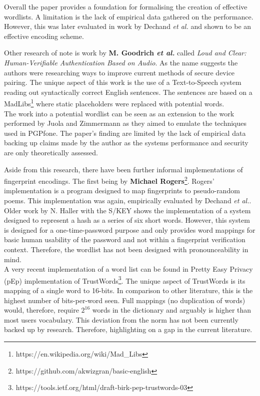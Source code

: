 Overall the paper provides a foundation for formalising the creation of effective wordlists. A limitation is the lack of empirical data gathered on the performance. However, this was later evaluated in work by Dechand \textit{et al.} \cite{dechand2016empirical} and shown to be an effective encoding scheme.

Other research of note is work by \textbf{M. Goodrich \textit{et al.}}\cite{goodrich2006loud} called \textit{Loud and Clear: Human-Verifiable Authentication Based on Audio}. As the name suggests the authors were researching ways to improve current methods of secure device pairing. The unique aspect of this work is the use of a Text-to-Speech system reading out syntactically correct English sentences. The sentences are based on a MadLibs\footnote{https://en.wikipedia.org/wiki/Mad\_Libs} where static placeholders were replaced with potential words.\\
The work into a potential wordlist can be seen as an extension to the work performed by Juola and Zimmermann\cite{juola1996whole} as they aimed to emulate the techniques used in PGPfone. The paper's finding are limited by the lack of empirical data backing up claims made by the author as the systems performance and security are only theoretically assessed.

Aside from this research, there have been further informal implementations of fingerprint encodings. The first being by \textbf{Michael Rogers}\footnote{https://github.com/akwizgran/basic-english}. Rogers' implementation is a program designed to map fingerprints to pseudo-random poems. This implementation was again, empirically evaluated by Dechand \textit{et al.}\cite{dechand2016empirical}. Older work by N. Haller with the S/KEY\cite{haller1995s} shows the implementation of a system designed to represent a hash as a series of six short words. However, this system is designed for a one-time-password purpose and only provides word mappings for basic human usability of the password and not within a fingerprint verification context. Therefore, the wordlist has not been designed with pronounceability in mind.
\\
A very recent implementation of a word list can be found in Pretty Easy Privacy (pEp) implementation of TrustWords\footnote{https://tools.ietf.org/html/draft-birk-pep-trustwords-03}. The unique aspect of TrustWords is its mapping of a single word to 16-bits. In comparison to other literature, this is the highest number of bits-per-word seen. Full mappings (no duplication of words) would, therefore, require $2^{16}$ words in the dictionary and arguably is higher than most users vocabulary. This deviation from the norm has not been currently backed up by research. Therefore, highlighting on a gap in the current literature.

